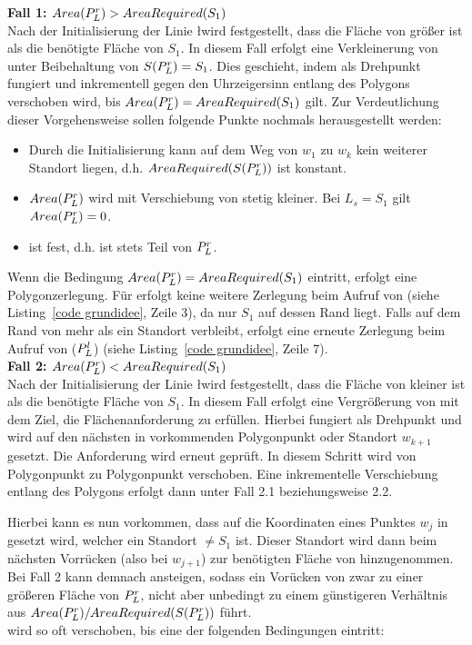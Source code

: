 \documentclass[ngerman]{seminarbeitrag}
\begin{document}
\textbf{Fall 1: $Area(P_{L}^{r})>AreaRequired(S_{1})$} \\
Nach der Initialisierung der Linie \l wird festgestellt, dass die Fläche von \prl größer ist als die benötigte Fläche von $S_{1}$. In diesem Fall erfolgt eine
Verkleinerung von \ar{\mprl} unter Beibehaltung von $S(P_{L}^{r})=S_{1}$. Dies geschieht, indem \Le als Drehpunkt fungiert und \ls inkrementell gegen den Uhrzeigersinn entlang des Polygons
verschoben wird, bis $Area(P_{L}^{r})=AreaRequired(S_{1})$ gilt. Zur Verdeutlichung dieser Vorgehensweise sollen folgende Punkte nochmals herausgestellt werden:

\begin{itemize}
\item Durch die Initialisierung kann auf dem Weg von $w_{1}$ zu $w_{k}$ kein weiterer Standort liegen, d.h. $AreaRequired(S(P_{L}^{r}))$ ist konstant.
\item $Area(P_{L}^{r})$ wird mit Verschiebung von \ls stetig kleiner. Bei $L_{s}=S_{1}$ gilt $Area(P_{L}^{r})=0$.
\item \Le ist fest, d.h. ist stets Teil von $P_{L}^{r}$.
\end{itemize}

Wenn die Bedingung $Area(P_{L}^{r})=AreaRequired(S_{1})$ eintritt, erfolgt eine Polygonzerlegung. Für \prl erfolgt keine weitere Zerlegung beim Aufruf von
\con (siehe Listing~\ref{code grundidee}, Zeile 3), da nur $S_{1}$ auf dessen Rand liegt. Falls auf dem Rand von \pll mehr als ein Standort verbleibt, erfolgt eine erneute
Zerlegung beim Aufruf von \con($P_{L}^{l}$) (siehe Listing~\ref{code grundidee}, Zeile 7).\\

\textbf{Fall 2: $Area(P_{L}^{r})<AreaRequired(S_{1})$} \\
Nach der Initialisierung der Linie \l wird festgestellt, dass die Fläche von \prl kleiner ist als die benötigte Fläche von $S_{1}$. In diesem Fall erfolgt eine Vergrößerung von \ar{\mprl}mit dem Ziel, die Flächenanforderung zu erfüllen. Hierbei fungiert \ls als Drehpunkt und \Le wird auf den nächsten in \w vorkommenden Polygonpunkt oder Standort $w_{k+1}$ gesetzt. Die Anforderung wird erneut geprüft. In diesem Schritt wird \Le von Polygonpunkt zu Polygonpunkt verschoben. Eine inkrementelle Verschiebung entlang des Polygons erfolgt dann unter Fall 2.1 beziehungsweise 2.2.

Hierbei kann es nun vorkommen, dass \Le auf die Koordinaten eines Punktes $w_{j}$ in \w gesetzt wird, welcher ein Standort $\ne S_{1}$ ist. Dieser Standort wird dann beim nächsten Vorrücken (also bei $w_{j+1}$) zur benötigten Fläche von \prl hinzugenommen. Bei Fall 2 kann \arreq{\mprl} demnach ansteigen, sodass ein Vorücken von \Le zwar zu einer größeren Fläche von $P_{L}^{r}$, nicht aber unbedingt zu einem günstigeren Verhältnis aus $Area(P_{L}^{r}) / AreaRequired(S(P_{L}^{r}))$ führt. \\
\Le wird so oft verschoben, bis eine der folgenden Bedingungen eintritt:\\
\end{document}
